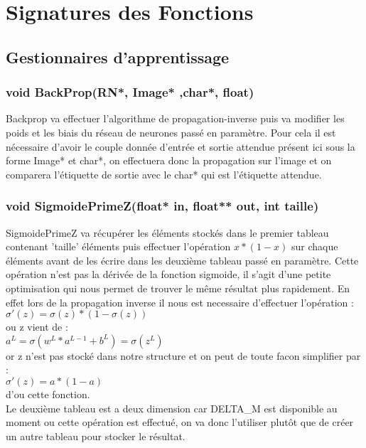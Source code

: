 \documentclass{article}
\begin{document}
	
	
	
	
	
	
\section{Signatures des Fonctions}
	\subsection{Gestionnaires d'apprentissage}
			\subsubsection{\textcolor{myblue}{\textbf{void}} BackProp(\textcolor{myblue}{\textbf{RN*}}, \textcolor{myblue}{\textbf{Image*}} ,\textcolor{myblue}{\textbf{char*}}, \textcolor{myblue}{\textbf{float}})}
				Backprop va effectuer l'algorithme de propagation-inverse puis va modifier les poids et les biais du réseau de neurones passé en paramètre. Pour cela il est nécessaire d'avoir le couple donnée d'entrée et sortie attendue présent ici sous la forme Image* et char*, on effectuera donc la propagation sur l'image et on comparera l'étiquette de sortie avec le char* qui est l'étiquette attendue.
				
			\subsubsection{\textcolor{myblue}{\textbf{void}} SigmoidePrimeZ(\textcolor{myblue}{\textbf{float*}} in, \textcolor{myblue}{\textbf{float**}} out, \textcolor{myblue}{\textbf{int}} taille)}
			SigmoidePrimeZ va récupérer les éléments stockés dans le premier tableau contenant 'taille' éléments puis effectuer l'opération $x*(1-x)$ sur chaque éléments avant de les écrire dans les deuxième tableau passé en paramètre. Cette opération n'est pas la dérivée de la fonction sigmoide, il s'agit d'une petite optimisation qui nous permet de trouver le même résultat plus rapidement. En effet lors de la propagation inverse il nous est necessaire d'effectuer l'opération : \\$\sigma'(z) = \sigma(z)*(1-\sigma(z))$\\ ou z vient de : \\$a^L = \sigma(w^L*a^{L-1}+b^L) = \sigma(z^L)$\\ or z n'est pas stocké dans notre structure et on peut de toute facon simplifier par :\\$\sigma'(z)=a*(1-a)$\\ d'ou cette fonction.\\
			Le deuxième tableau est a deux dimension car DELTA\_M est disponible au moment ou cette opération est effectué, on va donc l'utiliser plutôt que de créer un autre tableau pour stocker le résultat.
			
\end{document}
